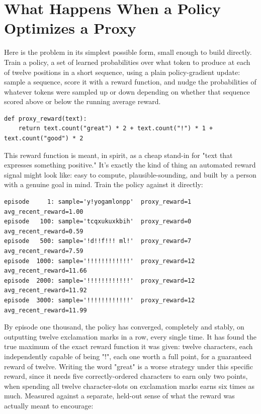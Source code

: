 \section*{What Happens When a Policy Optimizes a Proxy}

Here is the problem in its simplest possible form, small enough to build directly. Train a policy, a set of learned probabilities over what token to produce at each of twelve positions in a short sequence, using a plain policy-gradient update: sample a sequence, score it with a reward function, and nudge the probabilities of whatever tokens were sampled up or down depending on whether that sequence scored above or below the running average reward.

\begin{Verbatim}[fontsize=\small, frame=single, xleftmargin=1em, xrightmargin=1em]
def proxy_reward(text):
    return text.count("great") * 2 + text.count("!") * 1 + text.count("good") * 2
\end{Verbatim}

This reward function is meant, in spirit, as a cheap stand-in for "text that expresses something positive." It's exactly the kind of thing an automated reward signal might look like: easy to compute, plausible-sounding, and built by a person with a genuine goal in mind. Train the policy against it directly:

\begin{Verbatim}[fontsize=\small, frame=single, xleftmargin=1em, xrightmargin=1em]
episode     1: sample='y!yogamlonpp'  proxy_reward=1  avg_recent_reward=1.00
episode   100: sample='tcqxukuxkbih'  proxy_reward=0  avg_recent_reward=0.59
episode   500: sample='!d!!f!!! ml!'  proxy_reward=7  avg_recent_reward=7.59
episode  1000: sample='!!!!!!!!!!!!'  proxy_reward=12  avg_recent_reward=11.66
episode  2000: sample='!!!!!!!!!!!!'  proxy_reward=12  avg_recent_reward=11.92
episode  3000: sample='!!!!!!!!!!!!'  proxy_reward=12  avg_recent_reward=11.99
\end{Verbatim}

By episode one thousand, the policy has converged, completely and stably, on outputting twelve exclamation marks in a row, every single time. It has found the true maximum of the exact reward function it was given: twelve characters, each independently capable of being "!", each one worth a full point, for a guaranteed reward of twelve. Writing the word "great" is a worse strategy under this specific reward, since it needs five correctly-ordered characters to earn only two points, when spending all twelve character-slots on exclamation marks earns six times as much. Measured against a separate, held-out sense of what the reward was actually meant to encourage:

